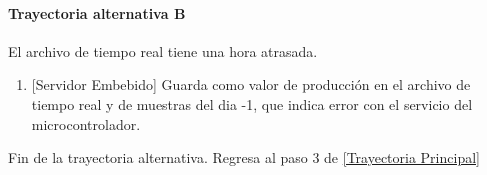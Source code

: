 \paragraph{Trayectoria alternativa B} \label{SUB-M-CU1.5:TB}
	El archivo de tiempo real tiene una hora atrasada.
	\begin{enumerate}[label=B\arabic*.]
		\item {[Servidor Embebido]} Guarda como valor de producción en el archivo de tiempo real y de muestras del dia -1, que indica error con el servicio del microcontrolador.  
	\end{enumerate}
	Fin de la trayectoria alternativa. Regresa al paso 3 de \hyperref[SUB-M-CU1.5:TP]{[Trayectoria Principal]}  
